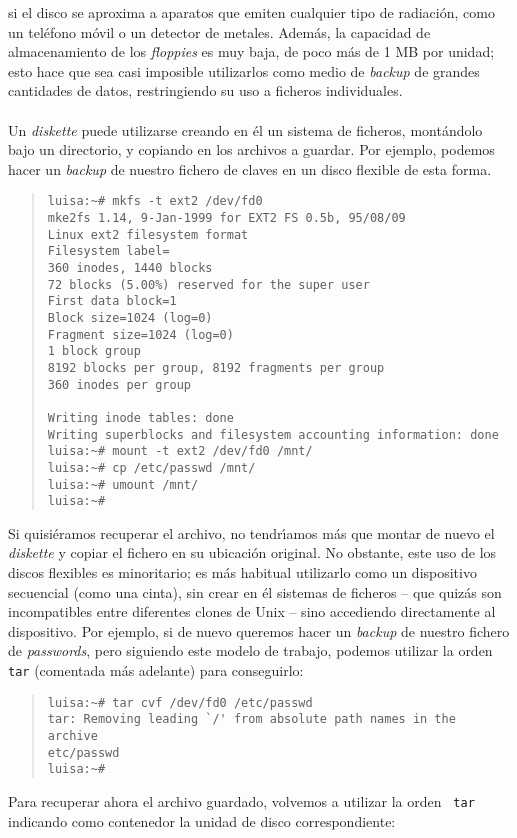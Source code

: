 si el disco se aproxima a aparatos que emiten cualquier tipo de radiaci\'on,
como un tel\'efono m\'ovil o un detector de metales. Adem\'as, la capacidad de
almacenamiento de los {\it floppies} es muy baja, de poco m\'as de 1 MB por
unidad; esto hace que sea casi imposible utilizarlos como medio de 
{\it backup} de grandes cantidades de datos, restringiendo su uso a ficheros
individuales.\\
\\Un {\it diskette} puede utilizarse creando en \'el un sistema de ficheros,
mont\'andolo bajo un directorio, y copiando en los archivos a guardar. Por
ejemplo, podemos hacer un {\it backup} de nuestro fichero de claves en un disco 
flexible de esta forma.
\begin{quote}
\begin{verbatim}
luisa:~# mkfs -t ext2 /dev/fd0
mke2fs 1.14, 9-Jan-1999 for EXT2 FS 0.5b, 95/08/09
Linux ext2 filesystem format
Filesystem label=
360 inodes, 1440 blocks
72 blocks (5.00%) reserved for the super user
First data block=1
Block size=1024 (log=0)
Fragment size=1024 (log=0)
1 block group
8192 blocks per group, 8192 fragments per group
360 inodes per group

Writing inode tables: done                            
Writing superblocks and filesystem accounting information: done
luisa:~# mount -t ext2 /dev/fd0 /mnt/
luisa:~# cp /etc/passwd /mnt/
luisa:~# umount /mnt/
luisa:~# 
\end{verbatim}
\end{quote}
Si quisi\'eramos recuperar el archivo, no tendr\'{\i}amos m\'as que montar de
nuevo el {\it diskette} y copiar el fichero en su ubicaci\'on original. No 
obstante, este uso de los discos flexibles es minoritario; es m\'as habitual
utilizarlo como un dispositivo secuencial (como una cinta), sin crear en \'el
sistemas de ficheros -- que quiz\'as son incompatibles entre diferentes clones
de Unix -- sino accediendo directamente al dispositivo. Por ejemplo, si de
nuevo queremos hacer un {\it backup} de nuestro fichero de {\it passwords}, pero
siguiendo este modelo de trabajo, podemos utilizar la orden {\tt tar} 
(comentada m\'as adelante) para conseguirlo:
\begin{quote}
\begin{verbatim}
luisa:~# tar cvf /dev/fd0 /etc/passwd
tar: Removing leading `/' from absolute path names in the archive
etc/passwd
luisa:~#
\end{verbatim}
\end{quote}
Para recuperar ahora el archivo guardado, volvemos a utilizar la orden {\tt
tar} indicando como contenedor la unidad de disco correspondiente:
